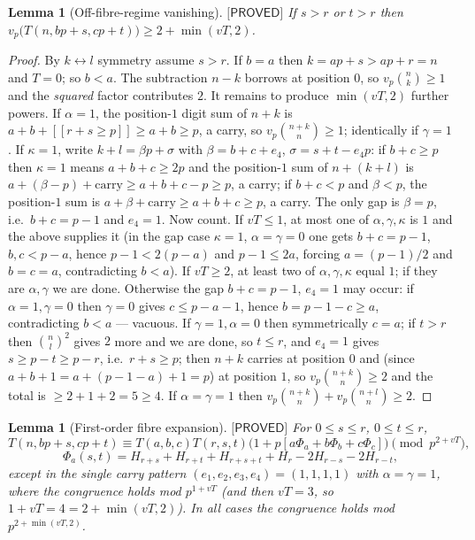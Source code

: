 \documentclass[11pt,reqno]{amsart}
\theoremstyle{plain}
\newtheorem{lemma}[theorem]{Lemma}
\theoremstyle{definition}
\theoremstyle{remark}
\numberwithin{equation}{section}
\newcommand{\ii}[1]{[\![#1]\!]}
\newcommand{\PROVED}{\textsf{[PROVED]}}
\begin{document}
\begin{lemma}[Off-fibre-regime vanishing]\label{lem:F2}
$\PROVED$ If $s>r$ or $t>r$ then $v_p\bigl(T(n,bp+s,cp+t)\bigr)\ge2+\min(vT,2)$.
\end{lemma}

\begin{proof}
By $k\leftrightarrow l$ symmetry assume $s>r$. If $b=a$ then $k=ap+s>ap+r=n$ and $T=0$; so
$b<a$. The subtraction $n-k$ borrows at position $0$, so $v_p\binom nk\ge1$ and the
\emph{squared} factor contributes $2$. It remains to produce $\min(vT,2)$ further powers.
If $\alpha=1$, the position-$1$ digit sum of $n+k$ is $a+b+\ii{r+s\ge p}\ge a+b\ge p$, a carry,
so $v_p\binom{n+k}{n}\ge1$; identically if $\gamma=1$. If $\kappa=1$, write $k+l=\beta p+\sigma$
with $\beta=b+c+e_4$, $\sigma=s+t-e_4p$: if $b+c\ge p$ then $\kappa=1$ means $a+b+c\ge2p$ and
the position-$1$ sum of $n+(k+l)$ is $a+(\beta-p)+\text{carry}\ge a+b+c-p\ge p$, a carry; if
$b+c<p$ and $\beta<p$, the position-$1$ sum is $a+\beta+\text{carry}\ge a+b+c\ge p$, a carry.
The only gap is $\beta=p$, i.e.\ $b+c=p-1$ and $e_4=1$.
Now count. If $vT\le1$, at most one of $\alpha,\gamma,\kappa$ is $1$ and the above supplies it
(in the gap case $\kappa=1$, $\alpha=\gamma=0$ one gets $b+c=p-1$, $b,c<p-a$, hence
$p-1<2(p-a)$ and $p-1\le2a$, forcing $a=(p-1)/2$ and $b=c=a$, contradicting $b<a$). If
$vT\ge2$, at least two of $\alpha,\gamma,\kappa$ equal $1$; if they are $\alpha,\gamma$ we are
done. Otherwise the gap $b+c=p-1$, $e_4=1$ may occur: if $\alpha=1,\gamma=0$ then $\gamma=0$
gives $c\le p-a-1$, hence $b=p-1-c\ge a$, contradicting $b<a$ --- vacuous. If
$\gamma=1,\alpha=0$ then symmetrically $c=a$; if $t>r$ then $\binom nl^2$ gives $2$ more and we
are done, so $t\le r$, and $e_4=1$ gives $s\ge p-t\ge p-r$, i.e.\ $r+s\ge p$; then $n+k$
carries at position $0$ and (since $a+b+1=a+(p-1-a)+1=p$) at position $1$, so
$v_p\binom{n+k}{n}\ge2$ and the total is $\ge2+1+2=5\ge4$. If $\alpha=\gamma=1$ then
$v_p\binom{n+k}{n}+v_p\binom{n+l}{n}\ge2$.
\end{proof}

\begin{lemma}[First-order fibre expansion]\label{lem:F1}
$\PROVED$ For $0\le s\le r$, $0\le t\le r$,
\[
T(n,bp+s,cp+t)\equiv T(a,b,c)T(r,s,t)\bigl(1+p[a\Phi_a+b\Phi_b+c\Phi_c]\bigr)\pmod{p^{2+vT}},
\]
\[
\Phi_a(s,t)=H_{r+s}+H_{r+t}+H_{r+s+t}+H_r-2H_{r-s}-2H_{r-t},
\]
except in the single carry pattern $(e_1,e_2,e_3,e_4)=(1,1,1,1)$ with $\alpha=\gamma=1$, where
the congruence holds mod $p^{1+vT}$ (and then $vT=3$, so $1+vT=4=2+\min(vT,2)$). In all cases
the congruence holds mod $p^{2+\min(vT,2)}$.
\end{lemma}
\end{document}
